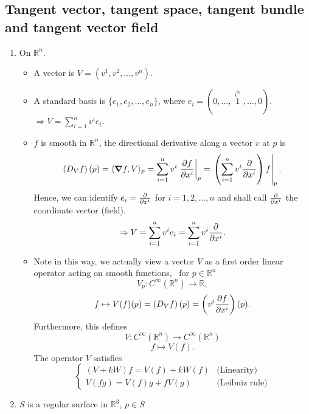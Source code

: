 \subsection*{Tangent vector, tangent space, tangent bundle and tangent vector field}
\begin{enumerate}[(1)]
    \item \label{Tangent vector: R^n case}
    On \(\mathbb{R}^n\).
    \begin{itemize}
        \item A vector is \(V=(v^1,v^2,\ldots,v^n)\).
        \item A standard basis is \(\{e_1,e_2,\ldots,e_n\}\), where 
        \(e_i=(0,\ldots,\mathop{1}\limits^{i^{th}},\ldots,0)\).\\
        \(\Rightarrow V=\sum_{i=1}^n v^i e_i\).
        \item \(f\) is smooth in \(\mathbb{R}^n\), the directional 
        derivative  along a vector \(v\) at \(p\) is 
        \[
            \left(D_V f\right)(p)=\langle\grad f,V\rangle_p
                =\sum_{i=1}^n v^i\left.\pdv{f}{x^i}\right|_p  
                =\left.\left(\sum_{i=1}^n v^i\pdv{x^i}\right)f\right|_p.
        \]
        Hence, we can identify \(e_i=\pdv{x^i}\) for \(i=1,2,\ldots,n\)
        and shall call \(\pdv{x^i}\) the coordinate vector (field).
        \[
            \Rightarrow V=\sum_{i=1}^n  v^i e_i=\sum_{i=1}^n v^i\pdv
            {x^i}.   
        \]
        \item Note in this way, we actually view a vector \(V\) as a 
        first order linear operator acting on smooth functions, \ie\ 
        for \(p\in \mathbb{R}^n\)
        \[
            V_p \colon  C^\infty\left(\mathbb{R}^n\right)\to \mathbb{R}
        ,\]
        \[ 
            f\mapsto  V(f)(p)=\left(D_V f\right)(p)=\left(v^i\pdv{f}{x^i}
            \right)(p)
        .\]
         Furthermore, this defines
         \[
            V\colon C^\infty\left(\mathbb{R}^n\right)\to 
            C^\infty\left(\mathbb{R}^n\right)   
         \]
         \[
            f\mapsto V(f)   
         .\]
        The operator \(V\) satisfies
        \[
            \begin{cases}
                (V+k W)f=V(f)+kW(f)&\text{(Linearity)}\\
                V(fg)=V(f)g +f V(g)&\text{(Leibniz rule)}
            \end{cases}    
        \]
    \end{itemize}
    \item \(S\) is a regular surface in \(\mathbb{R}^3\), \(p\in S\)

\end{enumerate}
